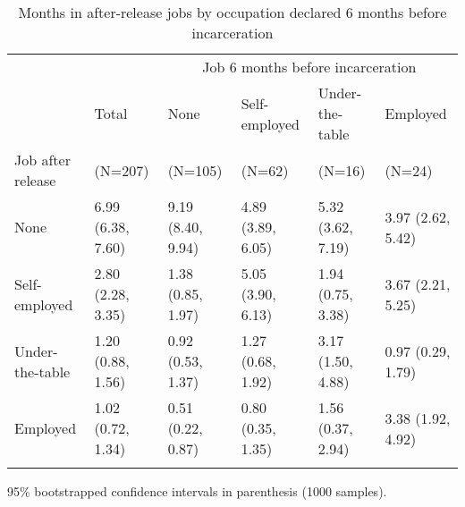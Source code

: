 
\begin{table}[htp]
\renewcommand{\arraystretch}{1.1}
\setlength{\tabcolsep}{6pt}
\centering
\scriptsize
\caption{Months in after-release jobs by occupation declared 6 months before incarceration} 
\label{tab:prejobs}
\begin{threeparttable}
\begin{tabular}{llllll}
 \hline
 \addlinespace
 & & \multicolumn{4}{c}{Job 6 months before incarceration} \\
 \addlinespace
 \cmidrule(lr){3-6} 
\addlinespace
 & Total & None & Self-employed & Under-the-table & Employed \\
Job after release  & \multicolumn{1}{l}{(N=207)} & \multicolumn{1}{l}{(N=105)} & \multicolumn{1}{l}{(N=62)}  &
\multicolumn{1}{l}{(N=16)} & \multicolumn{1}{l}{(N=24)} \\
\addlinespace
  \hline
 \addlinespace
None & 6.99 (6.38, 7.60) & 9.19 (8.40, 9.94) & 4.89 (3.89, 6.05) & 5.32 (3.62, 7.19) & 3.97 (2.62, 5.42) \\ 
  Self-employed & 2.80 (2.28, 3.35) & 1.38 (0.85, 1.97) & 5.05 (3.90, 6.13) & 1.94 (0.75, 3.38) & 3.67 (2.21, 5.25) \\ 
  Under-the-table & 1.20 (0.88, 1.56) & 0.92 (0.53, 1.37) & 1.27 (0.68, 1.92) & 3.17 (1.50, 4.88) & 0.97 (0.29, 1.79) \\ 
  Employed & 1.02 (0.72, 1.34) & 0.51 (0.22, 0.87) & 0.80 (0.35, 1.35) & 1.56 (0.37, 2.94) & 3.38 (1.92, 4.92) \\ 
  
\addlinespace
   \hline
\end{tabular}
\begin{tablenotes}
\item 95\% bootstrapped confidence intervals in parenthesis (1000 samples).
\end{tablenotes}
\end{threeparttable}
\end{table}
